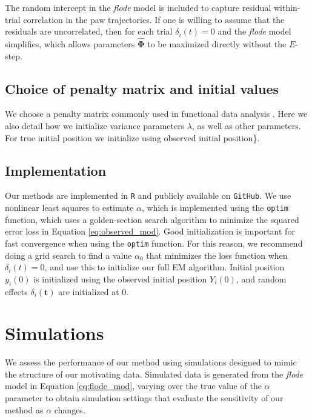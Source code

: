 \documentclass[preprint]{JASA}
\begin{document}
The random intercept in the \emph{flode} model is included to capture
residual within-trial correlation in the paw trajectories. If one is
willing to assume that the residuals are uncorrelated, then for each
trial \(\delta_i(t) = 0\) and the \emph{flode} model simplifies, which
allows parameters \(\widehat{\mathbf{\Phi}}\) to be maximized directly
without the \(E\)-step.

\hypertarget{choice-of-penalty-matrix-and-initial-values}{%
\subsection{Choice of penalty matrix and initial
values}\label{choice-of-penalty-matrix-and-initial-values}}

We choose a penalty matrix commonly used in functional data analysis
\citep{eilers1996, goldsmith2016}. Here we also detail how we initialize
variance parameters \(\lambda\), as well as other parameters. For true
initial position we initialize using observed initial position\}.

\hypertarget{implementation}{%
\subsection{Implementation}\label{implementation}}

Our methods are implemented in \texttt{R} and publicly available on
\texttt{GitHub}. We use nonlinear least squares to estimate \(\alpha\),
which is implemented using the \texttt{optim} function, which uses a
golden-section search algorithm to minimize the squared error loss in
Equation \ref{eq:observed_mod}. Good initialization is important for
fast convergence when using the \texttt{optim} function. For this
reason, we recommend doing a grid search to find a value \(\alpha_0\)
that minimizes the loss function when \(\delta_i(t) = 0\), and use this
to initialize our full EM algorithm. Initial position \(y_i(0)\) is
initialized using the observed initial position \(Y_i(0)\), and random
effects \(\delta_i(\mathbf{t})\) are initialized at 0.

\hypertarget{simulations}{%
\section{Simulations}\label{simulations}}

\label{sec:simulations}

We assess the performance of our method using simulations designed to
mimic the structure of our motivating data. Simulated data is generated
from the \emph{flode} model in Equation \ref{eq:flode_mod}, varying over
the true value of the \(\alpha\) parameter to obtain simulation settings
that evaluate the sensitivity of our method as \(\alpha\) changes.
\end{document}
